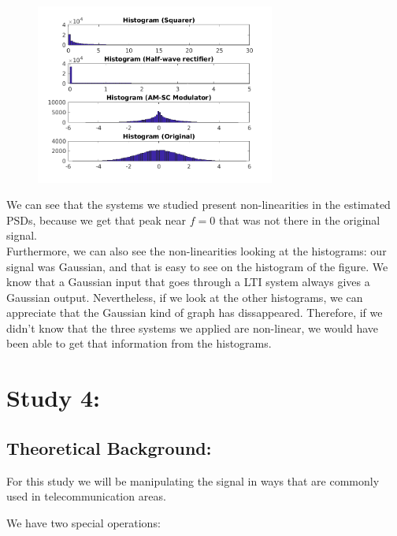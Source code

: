 \documentclass[a4paper,11pt]{article}
\begin{document}
\begin{figure}[!hp]
    \begin{center}
      \includegraphics[width=0.7\textwidth]{images/study3/comp_hist.png}
    \end{center}
\end{figure}

\newpage

We can see that the systems we studied present non-linearities in the estimated
PSDs, because we get that peak near $f = 0$ that was not there in the original
signal. \\

Furthermore, we can also see the non-linearities looking at the histograms: our
signal was Gaussian, and that is easy to see on the histogram of the figure. We
know that a Gaussian input that goes through a LTI system always gives a
Gaussian output. Nevertheless, if we look at the other histograms, we can
appreciate that the Gaussian kind of graph has dissappeared. Therefore, if we
didn't know that the three systems we applied are non-linear, we would have
been able to get that information from the histograms.

\newpage

\section{Study 4:}

\subsection{Theoretical Background:}

For this study we will be manipulating the signal in ways that are commonly
used in telecommunication areas.

We have two special operations:
\end{document}
